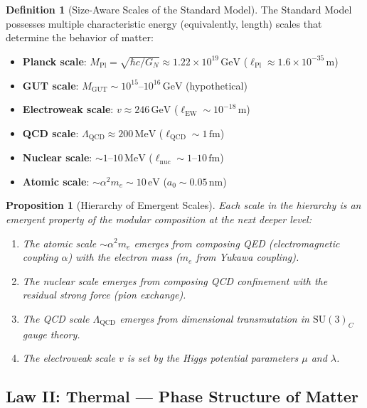 \documentclass[12pt]{article}
\newtheorem{proposition}[theorem]{Proposition}
\theoremstyle{definition}
\newtheorem{definition}[theorem]{Definition}
\theoremstyle{remark}
\newcommand{\GeV}{\,\mathrm{GeV}}
\newcommand{\MeV}{\,\mathrm{MeV}}
\begin{document}
\begin{definition}[Size-Aware Scales of the Standard Model]
\label{def:scales}
The Standard Model possesses multiple characteristic energy (equivalently, length) scales that determine the behavior of matter:
\begin{itemize}
    \item \textbf{Planck scale}: $M_{\mathrm{Pl}} = \sqrt{\hbar c / G_N} \approx 1.22 \times 10^{19}\GeV$ ($\ell_{\mathrm{Pl}} \approx 1.6 \times 10^{-35}\,\mathrm{m}$)
    \item \textbf{GUT scale}: $M_{\mathrm{GUT}} \sim 10^{15}\text{--}10^{16}\GeV$ (hypothetical)
    \item \textbf{Electroweak scale}: $v \approx 246\GeV$ ($\ell_{\mathrm{EW}} \sim 10^{-18}\,\mathrm{m}$)
    \item \textbf{QCD scale}: $\Lambda_{\mathrm{QCD}} \approx 200\MeV$ ($\ell_{\mathrm{QCD}} \sim 1\,\mathrm{fm}$)
    \item \textbf{Nuclear scale}: $\sim 1\text{--}10\MeV$ ($\ell_{\mathrm{nuc}} \sim 1\text{--}10\,\mathrm{fm}$)
    \item \textbf{Atomic scale}: $\sim \alpha^2 m_e \sim 10\,\mathrm{eV}$ ($a_0 \sim 0.05\,\mathrm{nm}$)
\end{itemize}
\end{definition}

\begin{proposition}[Hierarchy of Emergent Scales]
\label{prop:hierarchy}
Each scale in the hierarchy is an emergent property of the modular composition at the next deeper level:
\begin{enumerate}
    \item The atomic scale $\sim \alpha^2 m_e$ emerges from composing QED (electromagnetic coupling $\alpha$) with the electron mass ($m_e$ from Yukawa coupling).
    \item The nuclear scale emerges from composing QCD confinement with the residual strong force (pion exchange).
    \item The QCD scale $\Lambda_{\mathrm{QCD}}$ emerges from dimensional transmutation in $\mathrm{SU}(3)_C$ gauge theory.
    \item The electroweak scale $v$ is set by the Higgs potential parameters $\mu$ and $\lambda$.
\end{enumerate}
\end{proposition}

\subsection{Law II: Thermal --- Phase Structure of Matter}
\end{document}
